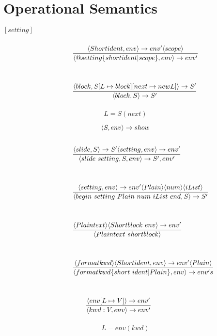 \chapter{Operational Semantics}

$[setting]$
\[ \condinfrule{\langle Shortident, env \rangle \ra env' \langle scope \rangle} { \langle @ setting \{ shortident | scope \}, env \rangle \ra env'}{} \]

\noindent{$[slide]$}
\[ \condinfrule{\langle block, S[L \mapsto block] [next \mapsto new L] \rangle \ra S'} { \langle block, S \rangle \ra S'}{} \]
\[ L = S(next)\]

\noindent{$[slideshow]$}
\[ \langle S, env \rangle \rightarrow show \]

\noindent{$[laks]$}
\[ \condinfrule{\langle slide, S \rangle \ra S' \langle setting, env \rangle \ra env'} { \langle slide~setting, S, env \rangle \ra S', env'}{} \]

\noindent{$[Block]$}
\[ \condinfrule{\langle setting, env \rangle \ra env' \langle Plain \rangle \langle num \rangle \langle iList \rangle} { \langle begin~setting~Plain~num~iList~end, S \rangle \ra S'}{} \]

\noindent{$[Plain]$}
\[ \condinfrule{\langle Plaintext \rangle \langle Shortblock~env \rangle \ra env'} { \langle Plaintext~shortblock \rangle }{} \]

\noindent{$[Shortblock]$}
\[ \condinfrule{\langle formatkwd \rangle \langle Shortident, env \rangle \ra env' \langle Plain \rangle} { \langle formatkwd \{short~ident | Plain\}, env \rangle \ra env's}{} \]

\noindent{$[Shortident]$}
\[ \condinfrule{\langle env [L \mapsto V] \rangle \ra env'} { \langle kwd : V, env \rangle \ra env'}{} \]
\[ L = env(kwd)\]
